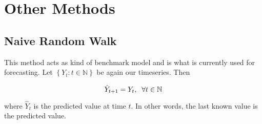 \section{Other Methods}
\label{sec: Other methods}

\subsection{Naive Random Walk}
\label{sec: Naive Random Walk}

This method acts as kind of benchmark model and is what is currently used for forecasting. Let $\left\{Y_t:t\in \mathbb{N}\right\}$ be again our timeseries. Then

\begin{equation}
\hat{Y}_{t+1} = Y_t ,\hspace{0.2cm} \forall t \in \mathbb{N}
\label{eq: Random Walk Model}
\end{equation}

where $\hat{Y}_{t}$ is the predicted value at time $t$. In other words, the last known value is the predicted value. 